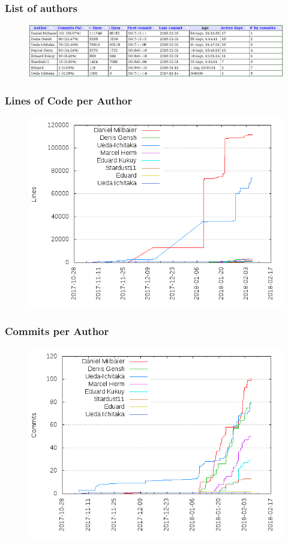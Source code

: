 \documentclass[11pt, usepdftitle=false,...]{beamer}
\begin{document}
			\begin{frame}
				\frametitle{List of authors}
				\begin{figure}[ht] 
					\centering
					\includegraphics[scale=0.45, trim= 1cm 0 0 0]{authors.png}
					\label{fig3}
				\end{figure}
			\end{frame}
			
			\begin{frame}
				\frametitle{Lines of Code per Author}
				\begin{figure}[ht] 
					\centering
					\includegraphics[scale=0.50, trim= 1cm 0 0 0]{lines_of_code_by_author.png}
					\label{fig4}
				\end{figure}
			\end{frame}
			
			\begin{frame}
				\frametitle{Commits per Author}
				\begin{figure}[ht] 
					\centering
					\includegraphics[scale=0.50, trim= 1cm 0 0 0]{commits_by_author.png}
					\label{fig5}
				\end{figure}
			\end{frame}
	
\end{document}
